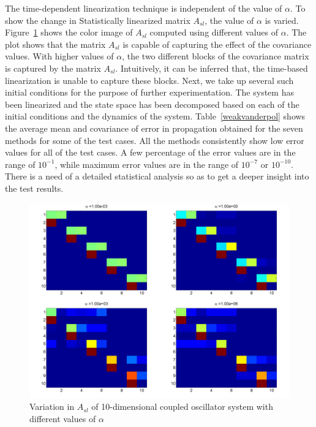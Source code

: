 \noindent The time-dependent linearization technique is independent of the value of $\alpha$. To show the change in Statistically linearized matrix $A_{sl}$, the value of $\alpha$ is varied. Figure~\ref{statlinsysts} shows the color image of $A_{sl}$ computed using different values of $\alpha$. The plot shows that the matrix $A_{sl}$ is capable of capturing the effect of the covariance values. With higher values of $\alpha$, the two different blocks of the covariance matrix is captured by the matrix $A_{sl}$. Intuitively, it can be inferred that, the time-based linearization is unable to capture these blocks. Next, we take up several such initial conditions for the purpose of further experimentation. The system has been linearized and the state space has been decomposed based on each of the initial conditions and the dynamics of the system. Table~\ref{weakvanderpol} shows the average mean and covariance of error in propagation obtained for the seven methods for some of the test cases. All the methods consistently show low error values for all of the test cases. A few percentage of the error values are in the range of $10^{-1}$, while maximum error values are in the range of $10^{-7}$ or $10^{-10}$. There is a need of a detailed statistical analysis so as to get a deeper insight into the test results. 

\begin{figure}[H]
        \centering
        \includegraphics[width=\textwidth]{figures/FIG_13}
        \caption{Variation in $A_{sl}$ of 10-dimensional coupled oscillator system with different values of $\alpha$}
        \label{statlinsysts}
\end{figure}

